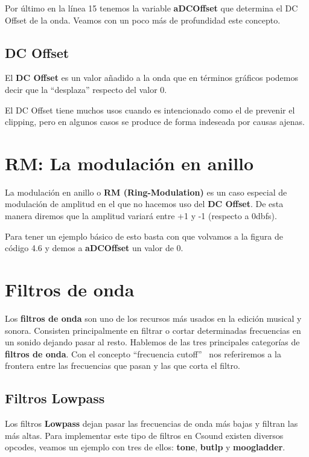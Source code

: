 Por último en la línea 15 tenemos la variable \textbf{aDCOffset} que determina el DC Offset de la onda. Veamos con un poco más de profundidad este concepto.

\subsection{DC Offset}
El \textbf{DC Offset} es un valor añadido a la onda que en términos gráficos podemos decir que la ``desplaza'' respecto del valor 0. 
 
El DC Offset tiene muchos usos cuando es intencionado como el de prevenir el clipping, pero en algunos casos se produce de forma indeseada por causas ajenas.
 
\section{RM: La modulación en anillo}

La modulación en anillo o \textbf{RM (Ring-Modulation)} es un caso especial de modulación de amplitud en el que no hacemos uso del \textbf{DC Offset}. De esta manera diremos que la amplitud variará entre +1 y -1 (respecto a 0dbfs).

Para tener un ejemplo básico de esto basta con que volvamos a la figura de código 4.6 y demos a \textbf{aDCOffset} un valor de 0.


\section{Filtros de onda}
Los \textbf{filtros de onda} son uno de los recursos más usados en la edición musical y sonora. Consisten principalmente en filtrar o cortar determinadas frecuencias en un sonido dejando pasar al resto. Hablemos de las tres principales categorías de \textbf{filtros de onda}.
Con el concepto ``frecuencia cutoff'' \ nos referiremos a la frontera entre las frecuencias que pasan y las que corta el filtro.

\subsection{Filtros Lowpass}

Los filtros \textbf{Lowpass} dejan pasar las frecuencias de onda más bajas y filtran las más altas. Para implementar este tipo de filtros en Csound existen diversos opcodes, veamos un ejemplo con tres de ellos: \textbf{tone}, \textbf{butlp} y \textbf{moogladder}.

